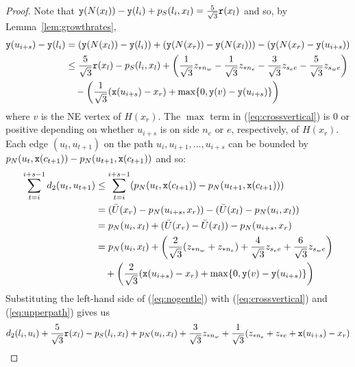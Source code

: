 \begin{proof}
Note that ${\tt y}(N(x_l)) - {\tt y}(l_i) + p_S(l_i,x_l) = \frac{5}{\sqrt{3}} {\tt r}(x_l)$ and so, by
Lemma~\ref{lem:growthrates},
\begin{align}
\label{eq:crossvertical}
{\tt y}(u_{i+s})-{\tt y}(l_i) & = ({\tt y}(N(x_l)) - {\tt y}(l_i)) + ({\tt y}(N(x_r)) - {\tt y}(N(x_l))) %
- ({\tt y}(N(x_r) - {\tt y}(u_{i+s}))  \notag \\
		   & \leq \frac{5}{\sqrt{3}} {\tt r}(x_l) - p_S(l_i,x_l) + 
                          \left(\frac{1}{\sqrt{3}}z_{\ast n_w} - \frac{1}{\sqrt{3}}z_{\ast n_e} -
                        \frac{3}{\sqrt{3}}z_{s_ee} - \frac{5}{\sqrt{3}}z_{s_we}\right) \notag \\ 
                   & \quad     - \left(\frac{1}{\sqrt{3}}({\tt x}(u_{i+s})-x_r) + \max\{0,{\tt y}(v) - {\tt y}(u_{i+s})\}\right)
\end{align}
where $v$ is the NE vertex of $H(x_r)$. The $\max$ term in (\ref{eq:crossvertical}) is 0 or
positive depending on whether $u_{i+s}$ is on
side $n_e$ or $e$, respectively, of $H(x_r)$. 
Each edge $(u_t,u_{t+1})$ on the path $u_i, u_{i+1}, \dots, u_{i+s}$
can be bounded by $p_N(u_t, {\tt x}(c_{t+1})) - p_N(u_{t+1},{\tt x}(c_{t+1}))$ and so:
\begin{align}
\label{eq:upperpath}
\sum_{t=i}^{i+s-1} d_2(u_t,u_{t+1}) & \leq \sum_{t=i}^{i+s-1} (p_N(u_t, {\tt x}(c_{t+1})) - p_N(u_{t+1},{\tt x}(c_{t+1}))) \notag \\
	& = (\bar{U}(x_r) - p_N(u_{i+s},x_r)) - (\bar{U}(x_l) - p_N(u_i,x_l)) \notag \\
	& = p_N(u_i,x_l) + (\bar{U}(x_r)- \bar{U}(x_l)) - p_N(u_{i+s},x_r)  \notag \\
	& = p_N(u_i,x_l) + \left(\frac{2}{\sqrt{3}}(z_{\ast n_w} + z_{\ast n_e}) + \frac{4}{\sqrt{3}}z_{s_ee} + \frac{6}{\sqrt{3}}z_{s_we}\right) \notag \\
   & \quad  + \left(\frac{2}{\sqrt{3}}({\tt x}(u_{i+s})-x_r) + \max\{0,{\tt y}(v) - {\tt y}(u_{i+s})\}\right)
\end{align}
Substituting the left-hand side of
(\ref{eq:nogentle}) with  (\ref{eq:crossvertical}) and 
(\ref{eq:upperpath}) gives us 
\begin{multline*}
d_2(l_i,u_i) + \frac{5}{\sqrt{3}} {\tt r}(x_l) - p_S(l_i,x_l) + p_N(u_i,x_l) +
\frac{3}{\sqrt{3}}z_{\ast n_w}+\frac{1}{\sqrt{3}}(z_{\ast n_e}+z_{\ast e}+{\tt x}(u_{i+s})-x_r)\\

\end{multline*}
\end{proof}

